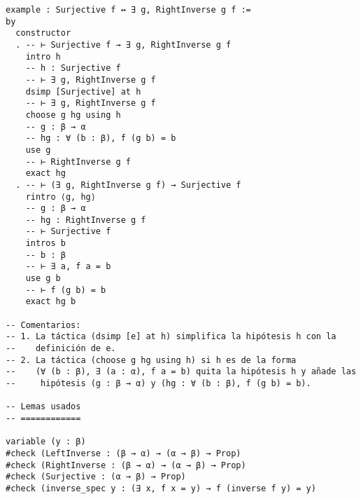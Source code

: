 \begin{verbatim}
example : Surjective f ↔ ∃ g, RightInverse g f :=
by
  constructor
  . -- ⊢ Surjective f → ∃ g, RightInverse g f
    intro h
    -- h : Surjective f
    -- ⊢ ∃ g, RightInverse g f
    dsimp [Surjective] at h
    -- ⊢ ∃ g, RightInverse g f
    choose g hg using h
    -- g : β → α
    -- hg : ∀ (b : β), f (g b) = b
    use g
    -- ⊢ RightInverse g f
    exact hg
  . -- ⊢ (∃ g, RightInverse g f) → Surjective f
    rintro ⟨g, hg⟩
    -- g : β → α
    -- hg : RightInverse g f
    -- ⊢ Surjective f
    intros b
    -- b : β
    -- ⊢ ∃ a, f a = b
    use g b
    -- ⊢ f (g b) = b
    exact hg b

-- Comentarios:
-- 1. La táctica (dsimp [e] at h) simplifica la hipótesis h con la
--    definición de e.
-- 2. La táctica (choose g hg using h) si h es de la forma
--    (∀ (b : β), ∃ (a : α), f a = b) quita la hipótesis h y añade las
--     hipótesis (g : β → α) y (hg : ∀ (b : β), f (g b) = b).

-- Lemas usados
-- ============

variable (y : β)
#check (LeftInverse : (β → α) → (α → β) → Prop)
#check (RightInverse : (β → α) → (α → β) → Prop)
#check (Surjective : (α → β) → Prop)
#check (inverse_spec y : (∃ x, f x = y) → f (inverse f y) = y)
\end{verbatim}

